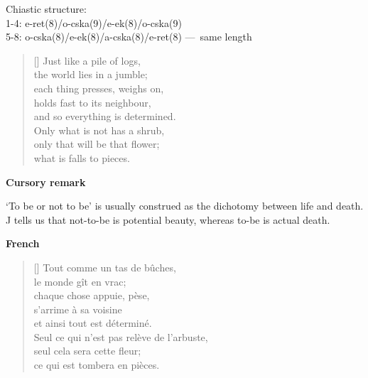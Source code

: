 \documentclass[a4paper,12pt,twoside,final]{book}
\begin{document}
\noindent Chiastic structure: \\
1-4: e-ret(8)/o-cska(9)/e-ek(8)/o-cska(9) \\
5-8: o-cska(8)/e-ek(8)/a-cska(8)/e-ret(8) ---~same length

\newpage


\settowidth{\versewidth}{and so everything is determined.}

\begin{verse}[\versewidth]
  Just like a pile of logs, \\
  the world lies in a jumble; \\
  each thing presses, weighs on, \\
  holds fast to its neighbour, \\
  and so everything is determined. \\
  Only what is not has a shrub, \\
  only that will be that flower; \\
  what is falls to pieces. \\
\end{verse}

\bigskip

\noindent \textbf{Cursory remark}

\medskip

`To be or not to be' is usually construed as the dichotomy between
life and death. J tells us that not-to-be is potential beauty, whereas
to-be is actual death.

\bigskip

\noindent \textbf{French}


\settowidth{\versewidth}{Seul ce qui n'est pas relève de l'arbuste,}

\begin{verse}[\versewidth]
  Tout comme un tas de bûches, \\
  le monde gît en vrac; \\
  chaque chose appuie, pèse, \\
  s'arrime à sa voisine \\
  et ainsi tout est déterminé. \\
  Seul ce qui n'est pas relève de l'arbuste, \\
  seul cela sera cette fleur; \\
  ce qui est tombera en pièces. \\
\end{verse}
\end{document}
